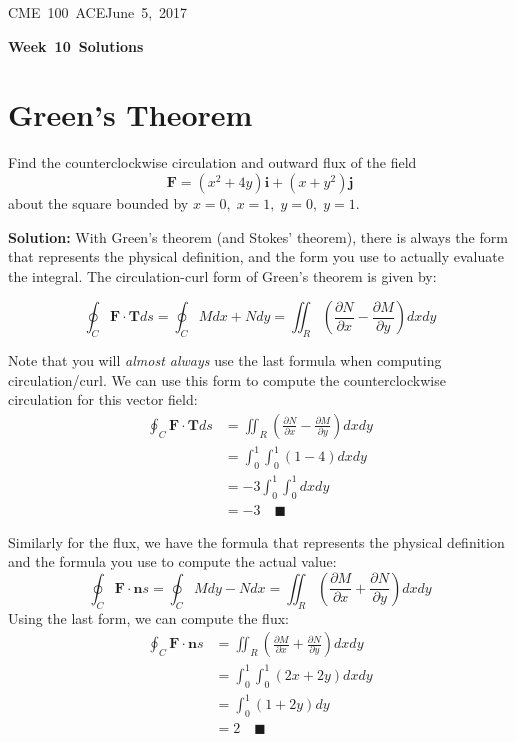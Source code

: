 \documentclass[letterpaper, 11pt]{article}
\makeatletter
\newcommand{\hmwkTitle}{Week\ 10\ Solutions} %
\newcommand{\hmwkClass}{CME\ 100\ ACE} %
\newcommand{\hmwkAuthorName}{Timothy Anderson} %
\newcommand{\hmwkAuthorEmail}{timmya@stanford.edu} %
\makeatother
\begin{document}
\noindent
\normalsize 
\hmwkClass \hfill June\ 5,\ 2017\\

\begin{center} \Large \textbf{\hmwkTitle} \end{center}

\section{Green's Theorem}
Find the counterclockwise circulation and outward flux of the field
\[ \bm{F} = (x^2 + 4y)\bm{i} + (x + y^2)\bm{j} \]
about the square bounded by $x = 0,\;x = 1,\;y = 0,\;y = 1$. 
\par \textbf{Solution:} With Green's theorem (and Stokes' theorem), there is always the form that represents the physical definition, and the form you use to actually evaluate the integral. The circulation-curl form of Green's theorem is given by:

\[ \oint_C \bm{F} \cdot \bm{T} ds = \oint_C Mdx + Ndy = \iint_R \left( \frac{\partial N}{\partial x} - \frac{ \partial M}{\partial y} \right) dxdy \]

Note that you will \textit{almost always} use the last formula when computing circulation/curl. We can use this form to compute the counterclockwise circulation for this vector field:
\begin{align*}
\oint_C \bm{F} \cdot \bm{T} ds &= \iint_R \left( \frac{\partial N}{\partial x} - \frac{ \partial M}{\partial y} \right) dxdy\\
&= \int_0^1 \int_0^1 (1 - 4) dx dy \\
&= -3 \int_0^1 \int_0^1 dx dy \\
&= -3 \quad\blacksquare
\end{align*}

Similarly for the flux, we have the formula that represents the physical definition and the formula you use to compute the actual value:
\[ \oint_C \bm{F} \cdot \bm{n} s = \oint_C M dy - Ndx = \iint_R \left( \frac{\partial M}{\partial x} + \frac{ \partial N}{\partial y} \right) dx dy \]
Using the last form, we can compute the flux:
\begin{align*}
\oint_C \bm{F} \cdot \bm{n} s &= \iint_R \left( \frac{\partial M}{\partial x} + \frac{ \partial N}{\partial y} \right) dx dy\\
&= \int_0^1 \int_0^1 (2x + 2y) dx dy \\
&= \int_0^1(1 + 2y)dy \\
&= 2 \quad\blacksquare 
\end{align*}
\end{document}
